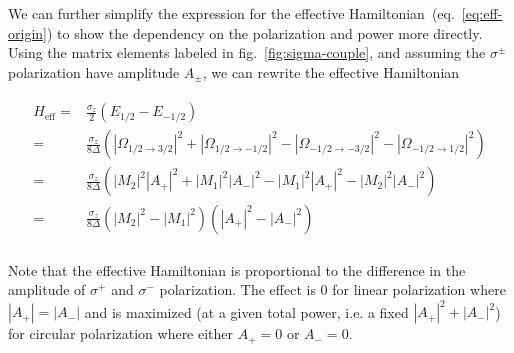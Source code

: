 \documentclass[10pt,fleqn]{article}
\newcommand{\eqar}[1]
{
  \begin{align}
    #1
  \end{align}
}
\newcommand{\paren}[1]{{\left({#1}\right)}}
\newcommand{\abs}[1]{{\left|{#1}\right|}}
\begin{document}
We can further simplify the expression for the effective
Hamiltonian~(eq.~\ref{eq:eff-origin}) to show the dependency on the polarization
and power more directly. Using the matrix elements labeled in
fig.~\ref{fig:sigma-couple}, and assuming the $\sigma^\pm$ polarization have amplitude
$A_\pm$, we can rewrite the effective Hamiltonian
\eqar{
  \begin{split}
    H_{\mathrm{eff}}=&\frac{\sigma_z}{2}\paren{E_{1/2}-E_{-1/2}}\\
    =&\frac{\sigma_z}{8\Delta}\paren{\abs{\Omega_{1/2\rightarrow3/2}}^2+\abs{\Omega_{1/2\rightarrow-1/2}}^2-\abs{\Omega_{-1/2\rightarrow-3/2}}^2-\abs{\Omega_{-1/2\rightarrow1/2}}^2}\\
    =&\frac{\sigma_z}{8\Delta}\paren{\abs{M_2}^2\abs{A_+}^2+\abs{M_1}^2\abs{A_-}^2-\abs{M_1}^2\abs{A_+}^2-\abs{M_2}^2\abs{A_-}^2}\\
    =&\frac{\sigma_z}{8\Delta}\paren{\abs{M_2}^2-\abs{M_1}^2}\paren{\abs{A_+}^2-\abs{A_-}^2}\\
  \end{split}
}
Note that the effective Hamiltonian is proportional to the difference in the amplitude
of $\sigma^+$ and $\sigma^-$ polarization. The effect is $0$ for linear polarization
where $\abs{A_+}=\abs{A_-}$ and is maximized (at a given total power,
i.e. a fixed $\abs{A_+}^2+\abs{A_-}^2$) for circular polarization where
either $A_+=0$ or $A_-=0$.
\end{document}
